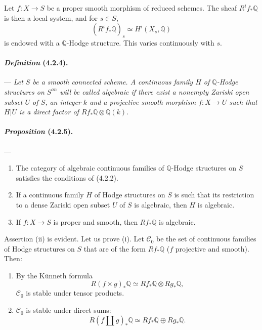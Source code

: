 \documentclass[10pt]{article}
\newcommand{\Q}{\mathbb Q}
\begin{document}
Let $f:X\to S$ be a proper smooth morphism of reduced schemes. The sheaf $R^if_*\Q$ is then a local system, and for $s\in S$,
\[
(R^if_*\Q)_s\simeq H^i(X_s,\Q)
\]
is endowed with a $\Q$-Hodge structure. This varies continuously with $s$.

\paragraph{\emph{Definition} (4.2.4).} --- {\itshape Let $S$ be a smooth connected scheme. A continuous family $H$ of $\Q$-Hodge structures on $S^{an}$ will be called algebraic if there exist a nonempty Zariski open subset $U$ of $S$, an integer $k$ and a projective smooth morphism $f:X\to U$ such that $H|U$ is a direct factor of $Rf_*\Q\otimes\Q(k)$.}

\paragraph{\emph{Proposition} (4.2.5).} --- {\itshape
\begin{enumerate}[label=(\roman*)]
\item The category of algebraic continuous families of $\Q$-Hodge structures on $S$ satisfies the conditions of (4.2.2).
\item If a continuous family $H$ of Hodge structures on $S$ is such that its restriction to a dense Zariski open subset $U$ of $S$ is algebraic, then $H$ is algebraic.
\item If $f:X\to S$ is proper and smooth, then $Rf_*\Q$ is algebraic.
\end{enumerate}}

Assertion (ii) is evident. Let us prove (i). Let $\mathcal C_0$ be the set of continuous families of Hodge structures on $S$ that are of the form $Rf_*\Q$ ($f$ projective and smooth). Then:
\begin{enumerate}[label=\alph*)]
\item By the Künneth formula
\[
R(f\times g)_*\Q\simeq Rf_*\Q\otimes Rg_*\Q,
\]
$\mathcal C_0$ is stable under tensor products.
\item $\mathcal C_0$ is stable under direct sums:
\[
R(f\amalg g)_*\Q\simeq Rf_*\Q\oplus Rg_*\Q.
\]
\end{enumerate}
\end{document}
